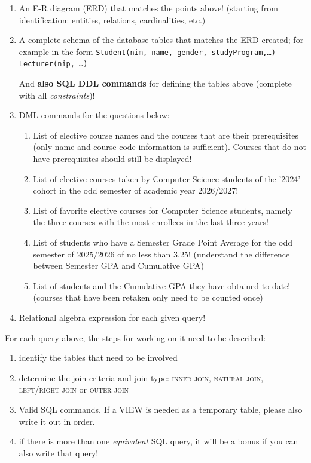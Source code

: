 \begin{deliverablebox}
    \begin{enumerate}
        \itemsep0em
     \item An E-R diagram (ERD) that matches the points above! (starting from identification: entities, relations, cardinalities, etc.)
     \item A complete schema of the database tables that matches the ERD created; for example in the form \newline \texttt{Student(nim, name, gender, studyProgram,\dots) \newline Lecturer(nip, \dots)}
     
     And \textbf{also SQL DDL commands} for defining the tables above (complete with all \textit{constraints})!
     \item DML commands for the questions below:
     \begin{enumerate}
         \itemsep0em \footnotesize \bfseries
         \item List of elective course names and the courses that are their prerequisites (only name and course code information is sufficient). Courses that do not have prerequisites should still be displayed!
         \item List of elective courses taken by Computer Science students of the '2024' cohort in the odd semester of academic year 2026/2027!
         \item List of favorite elective courses for Computer Science students, namely the three courses with the most enrollees in the last three years!
         \item List of students who have a Semester Grade Point Average for the odd semester of 2025/2026 of no less than 3.25! (understand the difference between Semester GPA and Cumulative GPA)
         \item List of students and the Cumulative GPA they have obtained to date! (courses that have been retaken only need to be counted once) 
     \end{enumerate}
     \item Relational algebra expression for each given query!
    \end{enumerate}
\end{deliverablebox}

\vspace{.2cm}
For each query above, the steps for working on it need to be described:
\begin{enumerate}
    \itemsep0em
     \item identify the tables that need to be involved
     \item determine the join criteria and join type: \textsc{inner join, natural join, left/right join} or \textsc{outer join}
     \item Valid SQL commands. If a \textsc{VIEW} is needed as a temporary table, please also write it out in order.
     \item if there is more than one \textit{equivalent} SQL query, it will be a bonus if you can also write that query!
\end{enumerate}

